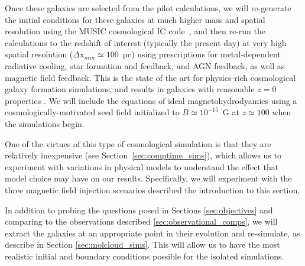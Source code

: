 %
%
%

Once these galaxies are selected from the pilot calculations, we will re-generate the initial
conditions for these galaxies at much higher mass and spatial
resolution using the MUSIC cosmological IC
code~\cite{2011MNRAS.415.2101H}, and then re-run the calculations to
the redshift of interest (typically the present day) at very high
spatial resolution ($\Delta \mathrm{x}_{min} \simeq 100$~pc) using
prescriptions for metal-dependent radiative cooling, star formation
and feedback, and AGN feedback, as well as magnetic field feedback.   This is the state of the art for
physics-rich cosmological galaxy formation simulations, and results in
galaxies with reasonable $z=0$ properties
\cite[e.g.,][]{2012MNRAS.423.1726S,2014MNRAS.444.1518V,2014MNRAS.445..581H}.
We will include the equations of ideal
magnetohydrodyamics using a cosmologically-motivated seed field
initialized to $B
\simeq 10^{-15}$~G at $z \simeq 100$ when the simulations begin.

One of the virtues of this type of cosmological simulation is that
they are relatively inexpensive (see Section~\ref{sec:comptime_sims}),
which allows us to experiment with variations in physical models to
understand the effect that model choice may have on our results.
Specifically, we will experiment with
the three magnetic field injection scenarios described the introduction to this
section.  

In addition to probing the questions posed in Sections
\ref{sec:objectives} and comparing to the observations described
\ref{sec:observational_comps}, we will
extract the galaxies at an appropriate point in their evolution and re-simulate,
as describe in Section \ref{sec:molcloud_sims}.  This will allow us to have the
most realistic initial and boundary conditions possible for the isolated
simulations.

